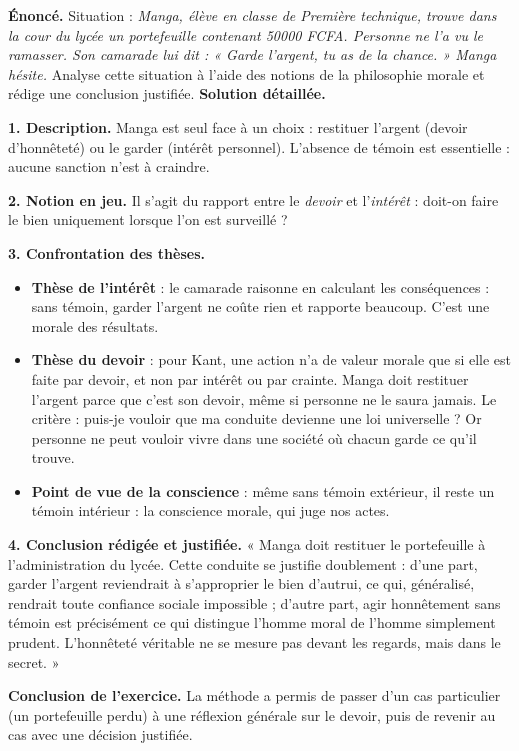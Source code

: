 \documentclass[11pt]{article}
\begin{document}
\begin{exoresolu}
\textbf{Énoncé.} Situation : \emph{Manga, élève en classe de Première technique, trouve dans la cour du lycée un portefeuille contenant \num{50000} FCFA. Personne ne l'a vu le ramasser. Son camarade lui dit : « Garde l'argent, tu as de la chance. » Manga hésite.} Analyse cette situation à l'aide des notions de la philosophie morale et rédige une conclusion justifiée.
\tcblower
\textbf{Solution détaillée.}

\textbf{1. Description.} Manga est seul face à un choix : restituer l'argent (devoir d'honnêteté) ou le garder (intérêt personnel). L'absence de témoin est essentielle : aucune sanction n'est à craindre.

\textbf{2. Notion en jeu.} Il s'agit du rapport entre le \emph{devoir} et l'\emph{intérêt} : doit-on faire le bien uniquement lorsque l'on est surveillé ?

\textbf{3. Confrontation des thèses.}
\begin{itemize}
\item \textbf{Thèse de l'intérêt} : le camarade raisonne en calculant les conséquences : sans témoin, garder l'argent ne coûte rien et rapporte beaucoup. C'est une morale des résultats.
\item \textbf{Thèse du devoir} : pour Kant, une action n'a de valeur morale que si elle est faite par devoir, et non par intérêt ou par crainte. Manga doit restituer l'argent parce que c'est son devoir, même si personne ne le saura jamais. Le critère : puis-je vouloir que ma conduite devienne une loi universelle ? Or personne ne peut vouloir vivre dans une société où chacun garde ce qu'il trouve.
\item \textbf{Point de vue de la conscience} : même sans témoin extérieur, il reste un témoin intérieur : la conscience morale, qui juge nos actes.
\end{itemize}

\textbf{4. Conclusion rédigée et justifiée.} « Manga doit restituer le portefeuille à l'administration du lycée. Cette conduite se justifie doublement : d'une part, garder l'argent reviendrait à s'approprier le bien d'autrui, ce qui, généralisé, rendrait toute confiance sociale impossible ; d'autre part, agir honnêtement sans témoin est précisément ce qui distingue l'homme moral de l'homme simplement prudent. L'honnêteté véritable ne se mesure pas devant les regards, mais dans le secret. »

\textbf{Conclusion de l'exercice.} La méthode a permis de passer d'un cas particulier (un portefeuille perdu) à une réflexion générale sur le devoir, puis de revenir au cas avec une décision justifiée.
\end{exoresolu}
\end{document}
